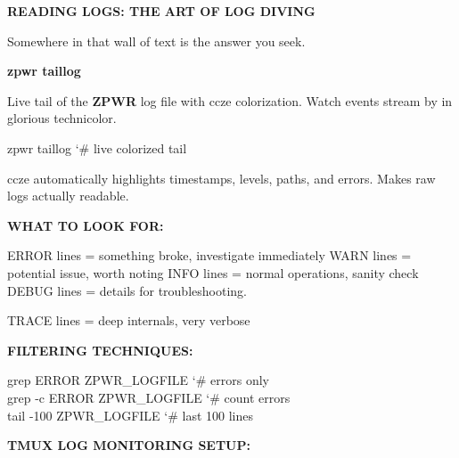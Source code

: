 \documentclass[11pt,a4paper,twoside]{book}
\begin{document}
\vspace{10pt}
{\large\bfseries\color{neoncyan} READING LOGS: THE ART OF LOG DIVING}\vspace{6pt}

Somewhere in that wall of text is the answer you seek.


\vspace{12pt}
{\bfseries\color{neonyellow} zpwr taillog}\vspace{4pt}

Live tail of the \textbf{ZPWR} log file with ccze colorization. Watch events stream by in glorious technicolor.

\begin{codebox}
\color{neongreen}zpwr taillog                {\char`\#} live colorized tail\\
\end{codebox}

ccze automatically highlights timestamps, levels, paths, and errors. Makes raw logs actually readable.


\vspace{12pt}
{\bfseries\color{neonyellow} WHAT TO LOOK FOR:}\vspace{4pt}

ERROR  lines = something broke, investigate immediately WARN   lines = potential issue, worth noting INFO   lines = normal operations, sanity check DEBUG  lines = details for troubleshooting.

\begin{codebox}
\color{neongreen}TRACE  lines = deep internals, very verbose\\
\end{codebox}


\vspace{12pt}
{\bfseries\color{neonyellow} FILTERING TECHNIQUES:}\vspace{4pt}

\begin{codebox}
\color{neongreen}grep ERROR ZPWR\_LOGFILE     {\char`\#} errors only\\
\color{neongreen}grep -c ERROR ZPWR\_LOGFILE  {\char`\#} count errors\\
\color{neongreen}tail -100 ZPWR\_LOGFILE      {\char`\#} last 100 lines\\
\end{codebox}


\vspace{12pt}
{\bfseries\color{neonyellow} TMUX LOG MONITORING SETUP:}\vspace{4pt}
\end{document}
